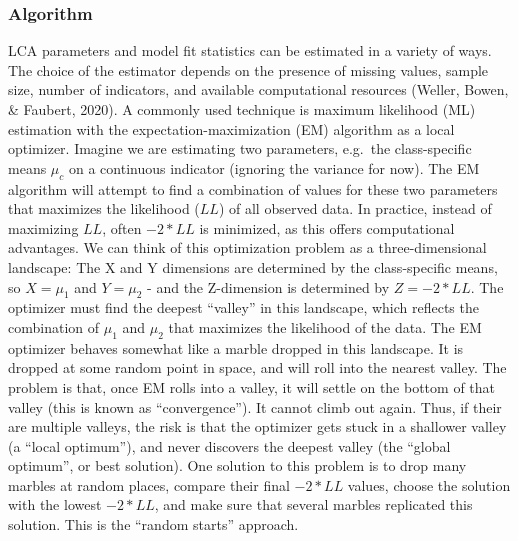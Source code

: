 \documentclass[
  ,man,floatsintext]{apa6}
\begin{document}
\hypertarget{algorithm}{%
\subsubsection{Algorithm}\label{algorithm}}

LCA parameters and model fit statistics can be estimated in a variety of
ways. The choice of the estimator depends on the presence of missing
values, sample size, number of indicators, and available computational
resources (Weller, Bowen, \& Faubert, 2020). A commonly used technique is maximum
likelihood (ML) estimation with the expectation-maximization (EM)
algorithm as a local optimizer. Imagine we are estimating two
parameters, e.g.~the class-specific means \(\mu_c\) on a continuous
indicator (ignoring the variance for now). The EM algorithm will attempt
to find a combination of values for these two parameters that maximizes
the likelihood (\(LL\)) of all observed data. In practice, instead of
maximizing \(LL\), often \(-2*LL\) is minimized, as this offers
computational advantages. We can think of this optimization problem as a
three-dimensional landscape: The X and Y dimensions are determined by
the class-specific means, so \(X = \mu_1\) and \(Y = \mu_2\) - and the
Z-dimension is determined by \(Z = -2*LL\). The optimizer must find the
deepest ``valley'' in this landscape, which reflects the combination of
\(\mu_1\) and \(\mu_2\) that maximizes the likelihood of the data. The EM
optimizer behaves somewhat like a marble dropped in this landscape. It
is dropped at some random point in space, and will roll into the nearest
valley. The problem is that, once EM rolls into a valley, it will settle
on the bottom of that valley (this is known as ``convergence''). It cannot
climb out again. Thus, if their are multiple valleys, the risk is that
the optimizer gets stuck in a shallower valley (a ``local optimum''), and
never discovers the deepest valley (the ``global optimum'', or best
solution). One solution to this problem is to drop many marbles at
random places, compare their final \(-2*LL\) values, choose the solution
with the lowest \(-2*LL\), and make sure that several marbles replicated
this solution. This is the ``random starts'' approach.
\end{document}
